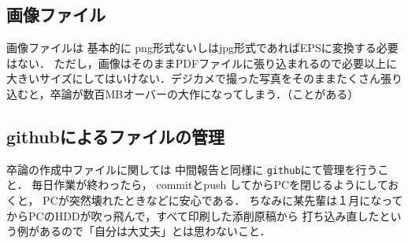 \subsection{画像ファイル}
画像ファイルは 基本的に png形式ないしはjpg形式であればEPSに変換する必要はない．
ただし，画像はそのままPDFファイルに張り込まれるので必要以上に大きいサイズにしてはいけない．デジカメで撮った写真をそのままたくさん張り込むと，卒論が数百MBオーバーの大作になってしまう．（ことがある）

\subsection{githubによるファイルの管理}
卒論の作成中ファイルに関しては 中間報告と同様に {\tt github}にて管理を行うこと．
毎日作業が終わったら， commitとpush してからPCを閉じるようにしておくと，
PCが突然壊れたときなどに安心である．
ちなみに某先輩は１月になってからPCのHDDが吹っ飛んで，すべて印刷した添削原稿から
打ち込み直したという例があるので「自分は大丈夫」とは思わないこと．
